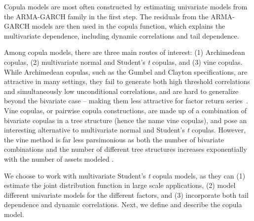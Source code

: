 Copula models are most often constructed by estimating univariate models from the ARMA-GARCH family in the first step. The residuals from the ARMA-GARCH models are then used in the copula function, which explains the multivariate dependence, including dynamic correlations and tail dependence.

Among copula models, there are three main routes of interest: (1) Archimedean copulas, (2) multivariate normal and Student's \textit{t} copulas, and (3) vine copulas. While Archimedean copulas, such as the Gumbel and Clayton specifications, are attractive in many settings, they fail to generate both high threshold correlations and simultaneously low unconditional correlations, and are hard to generalize beyond the bivariate case -- making them less attractive for factor return series~\autocite{ChristoffersenLanglois2013}. Vine copulas, or pairwise copula constructions, are made up of a combination of bivariate copulas in a tree structure (hence the name vine copulas), and pose an interesting alternative to multivariate normal and Student's \textit{t} copulas. However, the vine method is far less parsimonious as both the number of bivariate combinations and the number of different tree structures increases exponentially with the number of assets modeled \autocite{Aas2009}.

We choose to work with multivariate Student's \textit{t} copula models, as they can (1) estimate the joint distribution function in large scale applications, (2) model different univariate models for the different factors, and (3) incorporate both tail dependence and dynamic correlations. Next, we define and describe the copula model.
